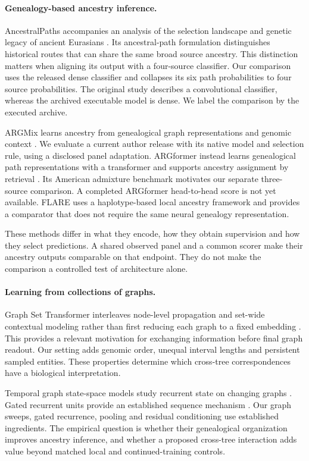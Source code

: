 \documentclass[letterpaper]{article}
\begin{document}
\paragraph{Genealogy-based ancestry inference.}
AncestralPaths accompanies an analysis of the selection landscape and genetic legacy of ancient Eurasians \citep{eurasians2024}. Its ancestral-path formulation distinguishes historical routes that can share the same broad source ancestry. This distinction matters when aligning its output with a four-source classifier. Our comparison uses the released dense classifier and collapses its six path probabilities to four source probabilities. The original study describes a convolutional classifier, whereas the archived executable model is dense. We label the comparison by the executed archive.

ARGMix learns ancestry from genealogical graph representations and genomic context \citep{ancientancestry2026}. We evaluate a current author release with its native model and selection rule, using a disclosed panel adaptation. ARGformer instead learns genealogical path representations with a transformer and supports ancestry assignment by retrieval \citep{argformer2026}. Its American admixture benchmark motivates our separate three-source comparison. A completed ARGformer head-to-head score is not yet available. FLARE uses a haplotype-based local ancestry framework \citep{flare2023} and provides a comparator that does not require the same neural genealogy representation.

These methods differ in what they encode, how they obtain supervision and how they select predictions. A shared observed panel and a common scorer make their ancestry outputs comparable on that endpoint. They do not make the comparison a controlled test of architecture alone.

\paragraph{Learning from collections of graphs.}
Graph Set Transformer interleaves node-level propagation and set-wide contextual modeling rather than first reducing each graph to a fixed embedding \citep{gst2026}. This provides a relevant motivation for exchanging information before final graph readout. Our setting adds genomic order, unequal interval lengths and persistent sampled entities. These properties determine which cross-tree correspondences have a biological interpretation.

Temporal graph state-space models study recurrent state on changing graphs \citep{graphssm2024}. Gated recurrent units provide an established sequence mechanism \citep{gru2014}. Our graph sweeps, gated recurrence, pooling and residual conditioning use established ingredients. The empirical question is whether their genealogical organization improves ancestry inference, and whether a proposed cross-tree interaction adds value beyond matched local and continued-training controls.
\end{document}
